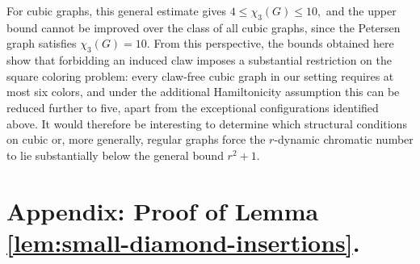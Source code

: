 \documentclass[a4paper,11pt]{article}
\newtheorem{lemma}     	[theorem] {Lemma}
\theoremstyle{case}
\numberwithin{subcase}{case}
\begin{document}
For cubic graphs, this general estimate gives
$
4\leq \chi_3(G)\leq 10,
$
and the upper bound cannot be improved over the class of all cubic graphs, since the Petersen graph satisfies \(\chi_3(G)=10\). From this perspective, the bounds obtained here show that forbidding an induced claw imposes a substantial restriction on the square coloring problem: every claw-free cubic graph in our setting requires at most six colors, and under the additional Hamiltonicity assumption this can be reduced further to five, apart from the exceptional configurations identified above.
It would therefore be interesting to determine which structural conditions on cubic or, more generally, regular graphs force the \(r\)-dynamic chromatic number to lie substantially below the general bound \(r^2+1\). 
\newpage
\section{Appendix: Proof of Lemma \ref{lem:small-diamond-insertions}.}


\end{document}
